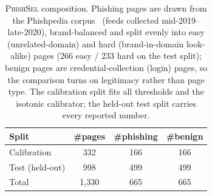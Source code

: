 \begin{table}[!h]
\caption{\textsc{PhishSel} composition. Phishing pages are drawn from the Phishpedia
corpus~\cite{lin2021phishpedia} (feeds collected mid-2019--late-2020), brand-balanced and
split evenly into easy (unrelated-domain) and hard (brand-in-domain look-alike) pages
($266$ easy / $233$ hard on the test split); benign pages are credential-collection (login) pages, so
the comparison turns on legitimacy rather than page type. The calibration split fits all
thresholds and the isotonic calibrator; the held-out test split carries every reported
number.}
\label{tab:dataset}
\footnotesize
\setlength{\tabcolsep}{6pt}
\begin{tabular}{lccc}
\toprule
Split & \#pages & \#phishing & \#benign \\
\midrule
Calibration      & \phantom{0,}332 & \phantom{0,}166 & \phantom{0,}166 \\
Test (held-out)  & \phantom{0,}998 & \phantom{0,}499 & \phantom{0,}499 \\
\midrule
Total            & 1{,}330 & \phantom{0,}665 & \phantom{0,}665 \\
\bottomrule
\end{tabular}
\end{table}
